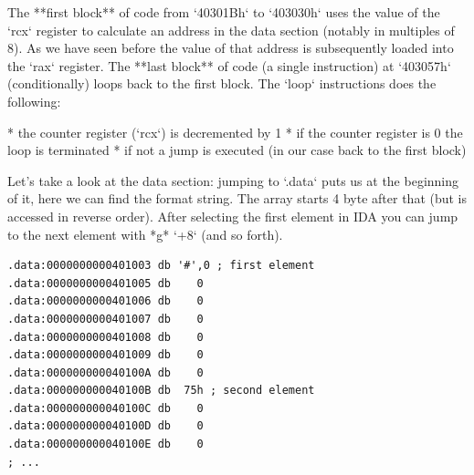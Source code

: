\begin{markdown}
\noindent The **first block** of code from `40301Bh` to `403030h` uses the value of the `rcx` register to calculate an address in the data section (notably in multiples of 8). As we have seen before the value of that address is subsequently loaded into the `rax` register.
\n
The **last block** of code (a single instruction) at `403057h` (conditionally) loops back to the first block. The `loop` instructions does the following:\s

* the counter register (`rcx`) is decremented by 1
* if the counter register is 0 the loop is terminated
* if not a jump is executed (in our case back to the first block) \cite{inteldev}

\noindent\s Let's take a look at the data section: jumping to `.data` puts us at the beginning of it, here we can find the format string.
\n
The array starts 4 byte after that (but is accessed in reverse order). After selecting the first element in IDA you can jump to the next element with *g* `+8` (and so forth).\s

\end{markdown}
\begin{lstlisting}[language={[x86masm]Assembler},name={beginning of array},label={data1.3}]
.data:0000000000401003 db '#',0 ; first element
.data:0000000000401005 db    0
.data:0000000000401006 db    0
.data:0000000000401007 db    0
.data:0000000000401008 db    0
.data:0000000000401009 db    0
.data:000000000040100A db    0
.data:000000000040100B db  75h ; second element
.data:000000000040100C db    0
.data:000000000040100D db    0
.data:000000000040100E db    0
; ...
\end{lstlisting}
